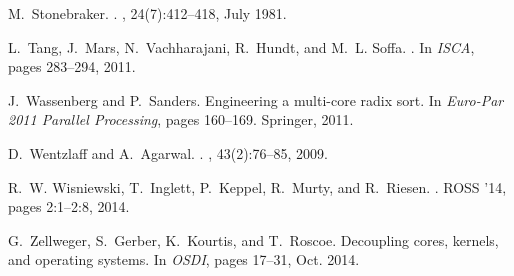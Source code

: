 \documentclass[11pt]{article}
\begin{document}
\begin{thebibliography}{10}
\begin{small}
M.~Stonebraker.
.
, 24(7):412--418, July 1981.

L.~Tang, J.~Mars, N.~Vachharajani, R.~Hundt, and M.~L. Soffa.
.
\newblock In {\em ISCA}, pages 283--294, 2011.

J.~Wassenberg and P.~Sanders.
\newblock Engineering a multi-core radix sort.
\newblock In {\em Euro-Par 2011 Parallel Processing}, pages 160--169. Springer,
  2011.

D.~Wentzlaff and A.~Agarwal.
.
, 43(2):76--85, 2009.

R.~W. Wisniewski, T.~Inglett, P.~Keppel, R.~Murty, and R.~Riesen.
.
\newblock ROSS '14, pages 2:1--2:8, 2014.

G.~Zellweger, S.~Gerber, K.~Kourtis, and T.~Roscoe.
\newblock Decoupling cores, kernels, and operating systems.
\newblock In {\em OSDI}, pages 17--31, Oct. 2014.
 
\end{small}

\end{thebibliography}
\end{document}

